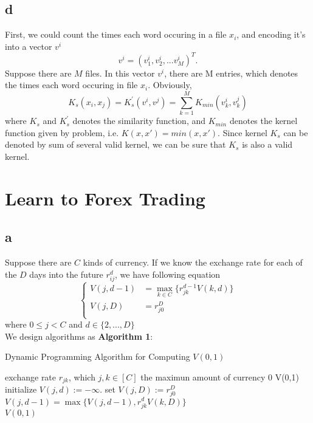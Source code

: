 \documentclass{article}
\begin{document}
	\subsection{d}
	First, we could count the times each word occuring in a file $x_i$, and encoding it's into a vector $v^i$
	$$
	v^i = (v^i_1, v^i_2, ...v^i_M)^T.
	$$
	Suppose there are $M$ files.
	In this vector $v^i$, there are M entries, which denotes the times each word occuring in file $x_i$.
	Obviously,
	$$K_s(x_i,x_j) = K_s^{'}(v^i, v^j)=\sum_{k=1}^M K_{min}(v^i_k,v^j_k)$$
	where $K_s$ and $K_s^{'}$ denotes the similarity function, and $K_{min}$ denotes the kernel function given by problem, i.e. $K(x,x') = min(x,x')$. Since kernel $K_s$ can be denoted by sum of several valid kernel, we can be sure that $K_s$ is also a valid kernel.

	\section{Learn to Forex Trading}
	\subsection{a}
	Suppose there are $C$ kinds of currency.
	If we know the exchange rate for each of the $D$ days into the future $r_{ij}^d$, we have following equation
	$$
	\begin{cases}
	V(j,d-1) &= \max\limits_{k\in{C}}\{r_{jk}^{d-1}V(k,d)\}\\
	V(j,D) &= r_{j0}^D \\
	\end{cases}
	$$
	where $0 \leq j < C$ and $d \in \{2,...,D\}$\\
	We design algorithms as \textbf{Algorithm 1}:
	\begin{algorithm}[htb]
		\caption{Dynamic Programming Algorithm for Computing $V(0,1)$}
		\begin{algorithmic}[1]
		\Require exchange rate $r_{jk}$, which $j,k \in [C]$
		\Ensure the maximun amount of currency $0$ V(0,1)
			\State initialize $V(j,d):=-\infty$.
		\EndFor
			\State set $V(j,D):=r_{j0}^D$
		\EndFor
					\State $V(j,d-1) = \max\{V(j,d-1), r_{jk}^dV(k, D)\}$
				\EndFor
			\EndFor
		\EndFor\\
		\Return $V(0,1)$

		\end{algorithmic}
	\end{algorithm}
\end{document}
